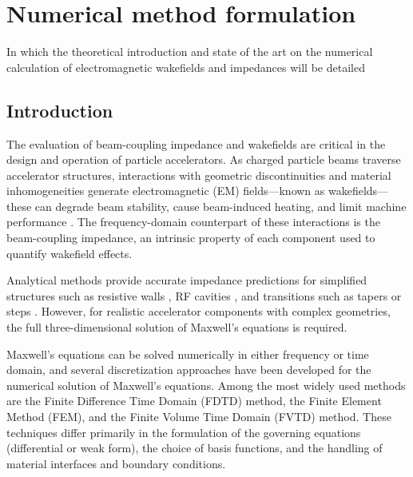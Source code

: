 %
\chapter{Numerical method formulation}
\label{ch::chapter3}

\begin{center}
  \begin{minipage}{0.5\textwidth}
    \begin{small}
      In which the theoretical introduction and state of the art on the numerical calculation of electromagnetic wakefields and impedances will be detailed
    \end{small}
  \end{minipage}
  \vspace{0.5cm}
\end{center}

\section{Introduction}
The evaluation of beam-coupling impedance and wakefields are critical in the design and operation of particle accelerators. As charged particle beams traverse accelerator structures, interactions with geometric discontinuities and material inhomogeneities generate electromagnetic (EM) fields—known as wakefields—these can degrade beam stability, cause beam-induced heating, and limit machine performance \cite{metral_impedance_2020}. The frequency-domain counterpart of these interactions is the beam-coupling impedance, an intrinsic property of each component used to quantify wakefield effects.

Analytical methods provide accurate impedance predictions for simplified structures such as resistive walls \cite{yokoya_resistive_1993, migliorati_resistive_2019}, RF cavities \cite{hofmann_analytic_1990, jensen_rf_2014}, and transitions such as tapers or steps \cite{yokoya_impedance_1990, stupakov_low_2007, palumbo_wake_1995}. However, for realistic accelerator components with complex geometries, the full three-dimensional solution of Maxwell’s equations \cite{maxwell_viii_1997} is required.

Maxwell’s equations can be solved numerically in either frequency or time domain, and several discretization approaches have been developed for the numerical solution of Maxwell's equations. Among the most widely used methods are the Finite Difference Time Domain (FDTD) method, the Finite Element Method (FEM), and the Finite Volume Time Domain (FVTD) method. These techniques differ primarily in the formulation of the governing equations (differential or weak form), the choice of basis functions, and the handling of material interfaces and boundary conditions. 

